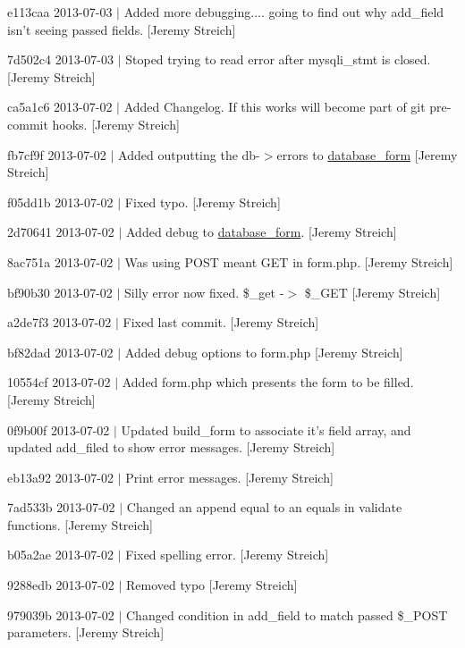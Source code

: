 \begin{DoxyItemize}
\item e113caa 2013-\/07-\/03 $|$ Added more debugging.... going to find out why add\-\_\-field isn't seeing passed fields. \mbox{[}Jeremy Streich\mbox{]}
\item 7d502c4 2013-\/07-\/03 $|$ Stoped trying to read error after mysqli\-\_\-stmt is closed. \mbox{[}Jeremy Streich\mbox{]}
\item ca5a1c6 2013-\/07-\/02 $|$ Added Changelog. If this works will become part of git pre-\/commit hooks. \mbox{[}Jeremy Streich\mbox{]}
\item fb7cf9f 2013-\/07-\/02 $|$ Added outputting the db-\/$>$errors to \hyperlink{classdatabase__form}{database\-\_\-form} \mbox{[}Jeremy Streich\mbox{]}
\item f05dd1b 2013-\/07-\/02 $|$ Fixed typo. \mbox{[}Jeremy Streich\mbox{]}
\item 2d70641 2013-\/07-\/02 $|$ Added debug to \hyperlink{classdatabase__form}{database\-\_\-form}. \mbox{[}Jeremy Streich\mbox{]}
\item 8ac751a 2013-\/07-\/02 $|$ Was using P\-O\-S\-T meant G\-E\-T in form.\-php. \mbox{[}Jeremy Streich\mbox{]}
\item bf90b30 2013-\/07-\/02 $|$ Silly error now fixed. \$\-\_\-get -\/$>$ \$\-\_\-\-G\-E\-T \mbox{[}Jeremy Streich\mbox{]}
\item a2de7f3 2013-\/07-\/02 $|$ Fixed last commit. \mbox{[}Jeremy Streich\mbox{]}
\item bf82dad 2013-\/07-\/02 $|$ Added debug options to form.\-php \mbox{[}Jeremy Streich\mbox{]}
\item 10554cf 2013-\/07-\/02 $|$ Added form.\-php which presents the form to be filled. \mbox{[}Jeremy Streich\mbox{]}
\item 0f9b00f 2013-\/07-\/02 $|$ Updated build\-\_\-form to associate it's field array, and updated add\-\_\-filed to show error messages. \mbox{[}Jeremy Streich\mbox{]}
\item eb13a92 2013-\/07-\/02 $|$ Print error messages. \mbox{[}Jeremy Streich\mbox{]}
\item 7ad533b 2013-\/07-\/02 $|$ Changed an append equal to an equals in validate functions. \mbox{[}Jeremy Streich\mbox{]}
\item b05a2ae 2013-\/07-\/02 $|$ Fixed spelling error. \mbox{[}Jeremy Streich\mbox{]}
\item 9288edb 2013-\/07-\/02 $|$ Removed typo \mbox{[}Jeremy Streich\mbox{]}
\item 979039b 2013-\/07-\/02 $|$ Changed condition in add\-\_\-field to match passed \$\-\_\-\-P\-O\-S\-T parameters. \mbox{[}Jeremy Streich\mbox{]}

\end{DoxyItemize}
